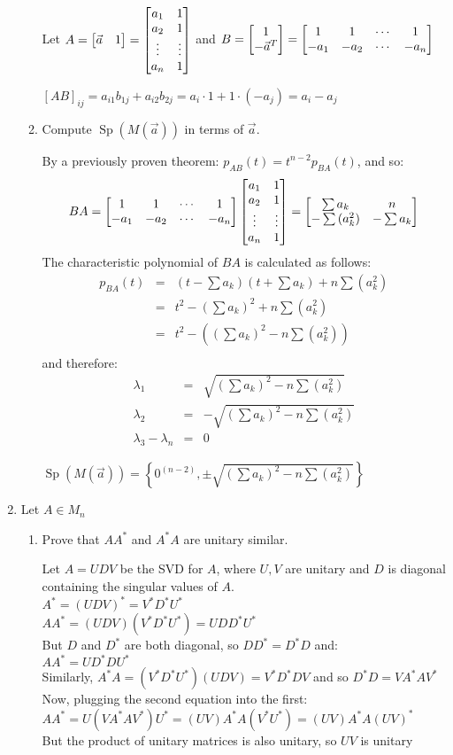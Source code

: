\documentclass[letterpaper,12pt,fleqn]{article}
\DeclareMathOperator{\Sp}{Sp}
\newcommand{\va}{\vec{a}}
\renewcommand{\l}{\lambda}
\begin{document}
\begin{enumerate}
\begin{enumerate}
    Let $A=\begin{bmatrix} \va & 1 \end{bmatrix}=\MA$ and
    $B=\begin{bmatrix} 1 \\ -\va^T \end{bmatrix}=\MB$

    $[AB]_{ij}=a_{i1}b_{1j}+a_{i2}b_{2j}=a_i\cdot1+1\cdot(-a_j)=a_i-a_j$

  \item Compute $\Sp(M(\va))$ in terms of $\va$.

    By a previously proven theorem: $p_{AB}(t)=t^{n-2}p_{BA}(t)$, and so:
    \[BA=\begin{bmatrix} 1 & 1 & \cdots & 1 \\ -a_1 & -a_2 & \cdots & -a_n \end{bmatrix}\begin{bmatrix} a_1 & 1 \\ a_2 & 1 \\ \vdots & \vdots \\ a_n & 1 \end{bmatrix}=\begin{bmatrix}
    \sum{a_k} & n \\ 
    -\sum{(a_k^2)} & -\sum{a_k}
    \end{bmatrix}\]
    The characteristic polynomial of $BA$ is calculated as follows:
    \begin{eqnarray*}
      p_{BA}(t) &=& (t-\sum{a_k})(t+\sum{a_k})+n\sum{(a_k^2)} \\
      &=& t^2-(\sum{a_k})^2+n\sum{(a_k^2)} \\
      &=& t^2-\left((\sum{a_k})^2-n\sum{(a_k^2)}\right) \\
    \end{eqnarray*}
    and therefore:
    \begin{eqnarray*}
      \l_1 &=& \sqrt{(\sum{a_k})^2-n\sum{(a_k^2)}} \\
      \l_2 &=& -\sqrt{(\sum{a_k})^2-n\sum{(a_k^2)}} \\
      \l_3-\l_n &=& 0
    \end{eqnarray*}

    $\Sp(M(\va))=\left\{0^{(n-2)},\pm\sqrt{(\sum{a_k})^2-n\sum{(a_k^2)}}\right\}$
  \end{enumerate}

  \newpage

\item Let $A\in M_n$
  \begin{enumerate}
  \item Prove that $AA^*$ and $A^*A$ are unitary similar.

    Let $A=UDV$ be the SVD for $A$, where $U,V$ are unitary and $D$ is diagonal
    containing the singular values of $A$. \\
    $A^*=(UDV)^*=V^*D^*U^*$ \\
    $AA^*=(UDV)(V^*D^*U^*)=UDD^*U^*$ \\
    But $D$ and $D^*$ are both diagonal, so $DD^*=D^*D$ and: \\
    $AA^*=UD^*DU^*$ \\
    Similarly, $A^*A=(V^*D^*U^*)(UDV)=V^*D^*DV$ and so $D^*D=VA^*AV^*$ \\
    Now, plugging the second equation into the first: \\
    $AA^*=U(VA^*AV^*)U^*=(UV)A^*A(V^*U^*)=(UV)A^*A(UV)^*$ \\
    But the product of unitary matrices is also unitary, so $UV$ is unitary


\end{enumerate}
\end{enumerate}
\end{document}

